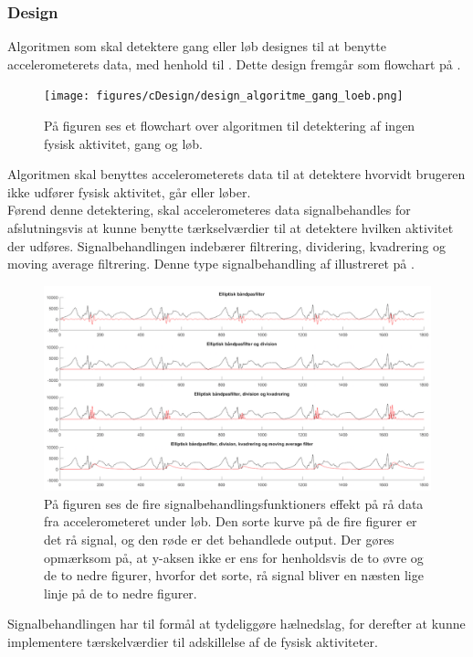 \subsubsection{Design} \label{design_algo_g_l}
Algoritmen som skal detektere gang eller løb designes til at benytte accelerometerets data, med henhold til . Dette design fremgår som flowchart på .
\begin{figure}[H]
	\centering
	\texttt{[image: figures/cDesign/design\_algoritme\_gang\_loeb.png]}
	\caption{På figuren ses et flowchart over algoritmen til detektering af ingen fysisk aktivitet, gang og løb.}
	\label{fig:design_algoritme_gang_loeb}
\end{figure}
Algoritmen skal benyttes accelerometerets data til at detektere hvorvidt brugeren ikke udfører fysisk aktivitet, går eller løber. \\
Førend denne detektering, skal accelerometeres data signalbehandles for afslutningsvis at kunne benytte tærkselværdier til at detektere hvilken aktivitet der udføres. Signalbehandlingen indebærer filtrering, dividering, kvadrering og moving average filtrering. Denne type signalbehandling af illustreret på .
\begin{figure}[H]
	\centering
	\includegraphics[width=1\textwidth]{figures/cDesign/signalbehandling_psoc.png}
	\caption{På figuren ses de fire signalbehandlingsfunktioners effekt på rå data fra accelerometeret under løb. Den sorte kurve på de fire figurer er det rå signal, og den røde er det behandlede output. Der gøres opmærksom på, at y-aksen ikke er ens for henholdsvis de to øvre og de to nedre figurer, hvorfor det sorte, rå signal bliver en næsten lige linje på de to nedre figurer.}
	\label{fig:algoritme_behandling}
\end{figure}
Signalbehandlingen har til formål at tydeliggøre hælnedslag, for derefter at kunne implementere tærskelværdier til adskillelse af de fysisk aktiviteter. \\
